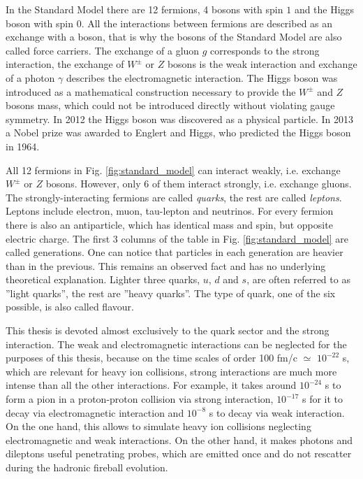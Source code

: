  In the Standard Model there are 12 fermions, 4 bosons with spin $1$ and the Higgs
boson with spin $0$.  All the interactions between fermions are described as an
exchange with a boson, that is why the bosons of the Standard Model are also called
force carriers. The exchange of a gluon $g$ corresponds to the strong interaction,
the exchange of $W^{\pm}$ or $Z$ bosons is the weak interaction and exchange of a
photon $\gamma$ describes the electromagnetic interaction. The Higgs boson was
introduced as a mathematical construction necessary to provide the $W^{\pm}$ and $Z$
bosons mass, which could not be introduced directly without violating gauge
symmetry.  In 2012 the Higgs boson was discovered as a physical particle. In 2013 a
Nobel prize was awarded to Englert and Higgs, who predicted the Higgs boson in 1964.


All 12 fermions in Fig. \ref{fig:standard_model} can interact weakly, i.e.
exchange $W^{\pm}$ or $Z$ bosons. However, only 6 of them interact
strongly, i.e. exchange gluons.  The strongly-interacting fermions are
called \emph{quarks}, the rest are called \emph{leptons}. Leptons include
electron, muon, tau-lepton and neutrinos. For every fermion there is also an
antiparticle, which has identical mass and spin, but opposite electric charge.
The first 3 columns of the table in Fig.  \ref{fig:standard_model} are called
generations. One can notice that  particles in each generation are
heavier than in the previous. This remains an observed fact and has no
underlying theoretical explanation.  Lighter three quarks, $u$, $d$ and $s$,
are often referred to as ''light quarks'', the rest are ''heavy quarks''. The
type of quark, one of the six possible, is also called flavour.

This thesis is devoted almost exclusively to the quark sector and the strong
interaction. The weak and electromagnetic interactions can be
neglected for the purposes of this thesis, because on the time scales of order
100 fm/c $\simeq$ $10^{-22}$ s, which are relevant for heavy ion
collisions, strong interactions are much more intense than all the
other interactions.
For example, it takes around $10^{-24}$ s to form a
pion in a proton-proton collision via strong interaction, $10^{-17}$ s
for it to decay  via electromagnetic interaction and $10^{-8}$ s to
decay via weak interaction. On the one hand, this allows to simulate heavy ion
collisions neglecting electromagnetic and weak interactions. On the other hand,
it makes photons and dileptons useful penetrating probes, which are emitted once and do not rescatter during the hadronic fireball evolution.



